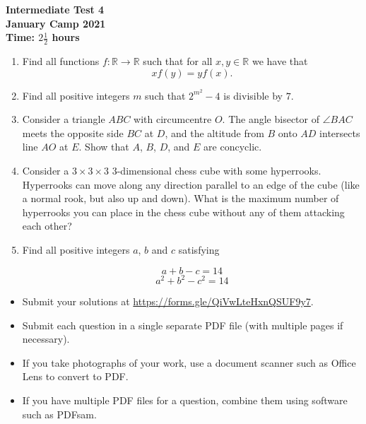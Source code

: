 \documentclass{article}
\begin{document}
\thispagestyle{empty}

\begin{center}
  \textbf{\Large Intermediate Test 4}
  \\ \vspace{1em}
  \textbf{\large January Camp 2021}
  \\ \vspace{1em}
  \textbf{\large Time: $2\frac{1}{2}$ hours}
\end{center}

\vspace{24pt}

\begin{enumerate}[1.]

\item %
Find all functions $f : \mathbb{R} \to \mathbb{R}$ such that for all $x, y \in \mathbb{R}$ we have that
\[ xf(y) = yf(x). \]


\item %
Find all positive integers $m$ such that $2^{m^2}-4$ is divisible by $7$.


\item %
Consider a triangle $ABC$ with circumcentre $O$.
The angle bisector of $\angle BAC$ meets the opposite side $BC$ at $D$, and the altitude from $B$ onto $AD$ intersects line $AO$ at $E$.
Show that $A$, $B$, $D$, and $E$ are concyclic.


\item %
Consider a $3\times3\times3$ 3-dimensional chess cube with some hyperrooks.
Hyperrooks can move along any direction parallel to an edge of the cube (like a normal rook, but also up and down).
What is the maximum number of hyperrooks you can place in the chess cube without any of them attacking each other?


\item %
Find all positive integers $a$, $b$ and $c$ satisfying 

$$a + b - c = 14 $$
$$a^2 + b^2 - c^2 = 14$$



\end{enumerate}


\vfill
\begin{itemize}
	\item Submit your solutions at \url{https://forms.gle/QiVwLteHxnQSUF9y7}.
	\item Submit each question in a single separate PDF file (with multiple pages if necessary).
	\item If you take photographs of your work, use a document scanner such as Office Lens to convert to PDF.
	\item If you have multiple PDF files for a question, combine them using software such as PDFsam.
\end{itemize}

\vfill
\centering
\begin{BVerbatim}
\end{BVerbatim}
\end{document}
